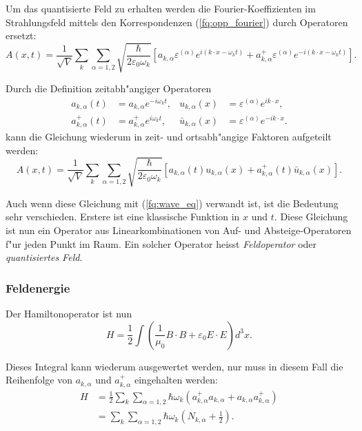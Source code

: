 \begin{refsection}
Um das quantisierte Feld zu erhalten werden die Fourier-Koeffizienten im Strahlungsfeld mittels den Korrespondenzen (\ref{fq:opp_fourier}) durch Operatoren ersetzt:
\begin{equation*}
A(x,t) = \frac{1}{\sqrt{V}} \sum_k \sum_{\alpha=1,2} \sqrt{\frac{\hbar}{2 \varepsilon_0 \omega_k}} \left[a_{k,\alpha} \varepsilon^{(\alpha)} e^{i (k \cdot x - \omega_k t)} + a^+_{k,\alpha} \varepsilon^{(\alpha)} e^{-i (k \cdot x - \omega_k t)}\right].
\end{equation*}

Durch die Definition zeitabh"angiger Operatoren
\begin{align*}
a_{k,\alpha}(t) &= a_{k,\alpha} e^{-i \omega_k t}, &
u_{k,\alpha}(x) &= \varepsilon^{(\alpha)} e^{ik \cdot x}, \\
a^+_{k,\alpha}(t) &= a^+_{k,\alpha} e^{i \omega_k t}, &
\bar{u}_{k,\alpha}(x) &= \varepsilon^{(\alpha)} e^{-ik \cdot x}.
\end{align*}
kann die Gleichung wiederum in zeit- und ortsabh"angige Faktoren aufgeteilt werden:
\begin{equation*}
A(x,t) = \frac{1}{\sqrt{V}} \sum_k \sum_{\alpha=1,2} \sqrt{\frac{\hbar}{2 \varepsilon_0 \omega_k}}\left[a_{k,\alpha}(t) u_{k,\alpha}(x) + a^+_{k,\alpha}(t) \bar{u}_{k,\alpha}(x) \right].
\end{equation*}

Auch wenn diese Gleichung mit (\ref{fq:wave_eq}) verwandt ist, ist die Bedeutung sehr verschieden. Erstere ist eine klassische Funktion in $x$ und $t$. Diese Gleichung ist nun ein Operator aus Linearkombinationen von Auf- und Absteige-Operatoren f"ur jeden Punkt im Raum. Ein solcher Operator heisst {\em Feldoperator} oder {\em quantisiertes Feld}.

\subsubsection{Feldenergie}
Der Hamiltonoperator ist nun
\begin{equation*}
H = \frac{1}{2} \int \left(\frac{1}{\mu_0} B \cdot B + \varepsilon_0 E \cdot E \right) d^3 x.
\end{equation*}

Dieses Integral kann wiederum ausgewertet werden, nur muss in diesem Fall die Reihenfolge von $a_{k,\alpha}$ und $a^+_{k,\alpha}$ eingehalten werden:
\begin{equation*}
\begin{split}
H &= \frac{1}{2} \sum_k \sum_{\alpha=1,2} \hbar \omega_k \left(a^+_{k,\alpha} a_{k,\alpha} + a_{k,\alpha} a^+_{k,\alpha}\right) \\
&= \sum_k \sum_{\alpha=1,2} \hbar \omega_k \left(N_{k,\alpha} + \frac{1}{2} \right).
\end{split}
\end{equation*}


\end{refsection}
